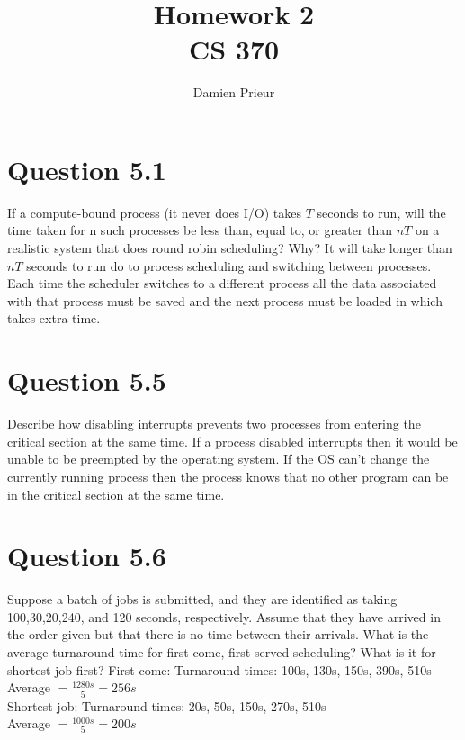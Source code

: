 \documentclass{article}
\author{Damien Prieur}
\title{Homework 2 \\ CS 370}
\date{}
\begin{document}
\maketitle

\section*{Question 5.1}
If a compute-bound process (it never does I/O) takes $T$ seconds to run, will the time taken for n such processes be less than, equal to, or greater than $nT$ on a realistic system that does round robin scheduling? Why?
\newline
It will take longer than $nT$ seconds to run do to process scheduling and switching between processes.
Each time the scheduler switches to a different process all the data associated with that process must be saved and the next process must be loaded in which takes extra time.

\section*{Question 5.5}
Describe how disabling interrupts prevents two processes from entering the critical section at the same time.
\newline
If a process disabled interrupts then it would be unable to be preempted by the operating system.
If the OS can't change the currently running process then the process knows that no other program can be in the critical section at the same time.

\section*{Question 5.6}
Suppose a batch of jobs is submitted, and they are identified as taking 100,30,20,240, and 120 seconds, respectively.
Assume that they have arrived in the order given but that there is no time between their arrivals.
What is the average turnaround time for first-come, first-served scheduling?
What is it for shortest job first?
\newline
First-come:
Turnaround times: 100s, 130s, 150s, 390s, 510s \\
Average $= \frac{1280s}{5} = 256s$ \\
Shortest-job:
Turnaround times: 20s, 50s, 150s, 270s, 510s \\
Average $= \frac{1000s}{5} = 200s$ \\

\end{document}
